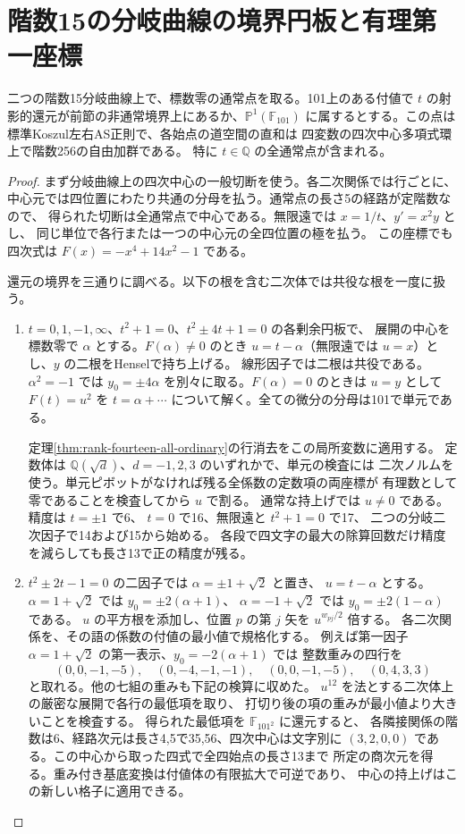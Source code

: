 \section{階数15の分岐曲線の境界円板と有理第一座標}
\label{sec:rank-fifteen-boundary-disks}
\begin{theorem}\label{thm:rank-fifteen-boundary-disks}
二つの階数15分岐曲線上で、標数零の通常点を取る。101上のある付値で
$t$ の射影的還元が前節の非通常境界上にあるか、$\mathbb P^1(\mathbb F_{101})$
に属するとする。この点は標準Koszul左右AS正則で、各始点の道空間の直和は
四変数の四次中心多項式環上で階数256の自由加群である。
特に $t\in\mathbb Q$ の全通常点が含まれる。
\end{theorem}
\begin{proof}
まず分岐曲線上の四次中心の一般切断を使う。各二次関係では行ごとに、
中心元では四位置にわたり共通の分母を払う。通常点の長さ5の経路が定階数なので、
得られた切断は全通常点で中心である。無限遠では $x=1/t$、$y'=x^2y$ とし、
同じ単位で各行または一つの中心元の全四位置の極を払う。
この座標でも四次式は $F(x)=-x^4+14x^2-1$ である。

還元の境界を三通りに調べる。以下の根を含む二次体では共役な根を一度に扱う。
\begin{enumerate}
\item $t=0,1,-1,\infty$、$t^2+1=0$、$t^2\pm4t+1=0$ の各剰余円板で、
展開の中心を標数零で $\alpha$ とする。$F(\alpha)\ne0$ のとき
$u=t-\alpha$（無限遠では $u=x$）とし、$y$ の二根をHenselで持ち上げる。
線形因子では二根は共役である。$\alpha^2=-1$ では $y_0=\pm4\alpha$
を別々に取る。$F(\alpha)=0$ のときは $u=y$ として
$F(t)=u^2$ を $t=\alpha+\cdots$ について解く。全ての微分の分母は101で単元である。

定理\ref{thm:rank-fourteen-all-ordinary}の行消去をこの局所変数に適用する。
定数体は $\mathbb Q(\sqrt d)$、$d=-1,2,3$ のいずれかで、単元の検査には
二次ノルムを使う。単元ピボットがなければ残る全係数の定数項の両座標が
有理数として零であることを検査してから $u$ で割る。
通常な持上げでは $u\ne0$ である。精度は $t=\pm1$ で6、
$t=0$ で16、無限遠と $t^2+1=0$ で17、
二つの分岐二次因子で14および15から始める。
各段で四文字の最大の除算回数だけ精度を減らしても長さ13で正の精度が残る。

\item $t^2\pm2t-1=0$ の二因子では $\alpha=\pm1+\sqrt2$ と置き、
$u=t-\alpha$ とする。$\alpha=1+\sqrt2$ では $y_0=\pm2(\alpha+1)$、
$\alpha=-1+\sqrt2$ では $y_0=\pm2(1-\alpha)$ である。
$u$ の平方根を添加し、位置 $p$ の第 $j$ 矢を $u^{w_{pj}/2}$ 倍する。
各二次関係を、その語の係数の付値の最小値で規格化する。
例えば第一因子 $\alpha=1+\sqrt2$ の第一表示、$y_0=-2(\alpha+1)$ では
整数重みの四行を
\[
 (0,0,-1,-5),\quad(0,-4,-1,-1),\quad
 (0,0,-1,-5),\quad(0,4,3,3)
\]
と取れる。他の七組の重みも下記の検算に収めた。
$u^{12}$ を法とする二次体上の厳密な展開で各行の最低項を取り、
打切り後の項の重みが最小値より大きいことを検査する。
得られた最低項を $\mathbb F_{101^2}$ に還元すると、
各隣接関係の階数は6、経路次元は長さ4,5で35,56、四次中心は文字別に
$(3,2,0,0)$ である。この中心から取った四式で全四始点の長さ13まで
所定の商次元を得る。重み付き基底変換は付値体の有限拡大で可逆であり、
中心の持上げはこの新しい格子に適用できる。


\end{enumerate}
\end{proof}

